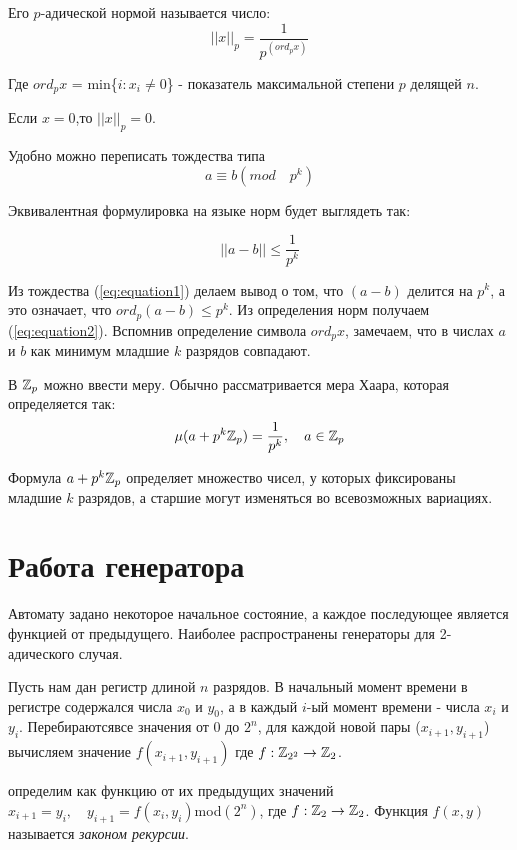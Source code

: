 Его $p$-адической
нормой называется число: 
$$||x||_p = \frac{1}{p^(ord_p x)} $$

Где $ord_p x$ = min\{$i : x_i \neq 0$\} - показатель максимальной степени $p$ делящей $n$. 

Если $x = 0$,то $||x||_p = 0$.


Удобно можно переписать тождества типа 
\begin{equation}
  \label{eq:equation1}
   a\equiv b (mod \quad p^k)
\end{equation}

Эквивалентная формулировка на языке норм будет выглядеть так: 

\begin{equation}
  \label{eq:equation2}
   ||a - b || \leq \frac{1}{p^k}
\end{equation}

Из тождества (\ref{eq:equation1}) делаем вывод о том, что $(a-b)$ делится на $p^k$, а это означает, что $ord_p (a - b) \leq p^k$. Из определения норм получаем  (\ref{eq:equation2}). Вспомнив определение символа $ord_p x$, замечаем, что в числах $a$ и $b$ как минимум младшие $k$ разрядов совпадают.

В $\mathbb{Z}_p$ можно ввести меру. Обычно рассматривается мера Хаара, которая определяется так:
\begin{equation}
  \label{eq:equation3}
    \mu(a + p^k \mathbb{Z}_p) = \frac{1}{p^k} , \quad  a \in \mathbb{Z}_p
\end{equation}

Формула $a + p^k \mathbb{Z}_p$ определяет множество чисел, у которых фиксированы младшие $k$ разрядов, а старшие могут изменяться во всевозможных вариациях. 

\section{Работа генератора} \label{sect1_6}

Автомату задано некоторое начальное состояние, а каждое последующее является функцией от предыдущего. Наиболее распространены генераторы для 2-адического случая.

Пусть нам дан регистр длиной $n$ разрядов. В начальный момент времени в регистре содержался числа $x_0$ и $y_0$, а в каждый $i$-ый момент времени - числа $x_i$ и $y_i$. Перебираютсявсе значения от 0 до $2^n$, для каждой новой пары ($x_{i+1},y_{i+1}$) вычисляем значение $f(x_{i+1},y_{i+1})$ где $f : \mathbb{Z}_{2^2} \rightarrow \mathbb{Z}_2$.

определим как функцию от их предыдущих значений $x_{i+1} = y_i,\quad y_{i+1} = f(x_i, y_i)$mod$(2^n)$, где $f : \mathbb{Z}_2 \rightarrow \mathbb{Z}_2$. Функция $f(x,y)$ называется \textit{законом рекурсии}.
\fi

